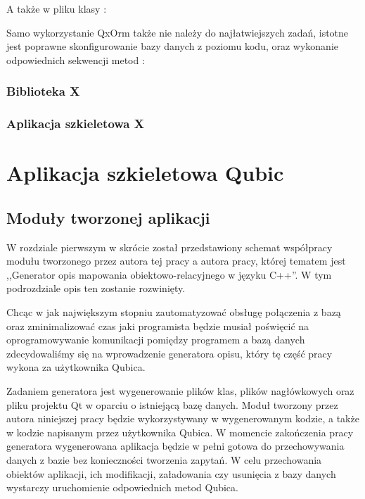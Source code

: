 \documentclass[12pt]{report}
\begin{document}


A także w pliku klasy \cite{qxorm}:



Samo wykorzystanie QxOrm także nie należy do najłatwiejszych zadań, istotne jest poprawne skonfigurowanie bazy danych z poziomu kodu, oraz wykonanie odpowiednich
sekwencji metod \cite{qxorm}:



\subsection{Biblioteka X}

\subsection{Aplikacja szkieletowa X}

\chapter{Aplikacja szkieletowa Qubic} \label{qubic}

\section{Moduły tworzonej aplikacji}

W rozdziale pierwszym w skrócie został przedstawiony schemat współpracy modułu tworzonego przez autora tej pracy a autora pracy, której tematem jest ,,Generator opis
mapowania obiektowo-relacyjnego w języku C++''. W tym podrozdziale opis ten zostanie rozwinięty.

Chcąc w jak największym stopniu zautomatyzować obsługę połączenia z bazą oraz zminimalizować czas jaki programista będzie musiał poświęcić na oprogra\-mowywanie
komunikacji pomiędzy programem a bazą danych zdecydowaliśmy się na wprowadzenie generatora opisu, który tę część pracy wykona za użytkownika Qubica.

Zadaniem generatora jest wygenerowanie plików klas, plików nagłówkowych oraz pliku projektu Qt w oparciu o istniejącą bazę danych. Moduł tworzony przez autora niniejszej
pracy będzie wykorzystywany w wygenerowanym kodzie, a także w kodzie napisanym przez użytkownika Qubica. W momencie zakończenia pracy generatora wygenerowana
aplikacja będzie w pełni gotowa do przechowywania danych z bazie bez konieczności tworzenia zapytań. W celu przechowania obiektów aplikacji, ich modifikacji, załadowania 
czy usunięcia z bazy danych wystarczy uruchomienie odpowiednich metod Qubica.
\end{document}

